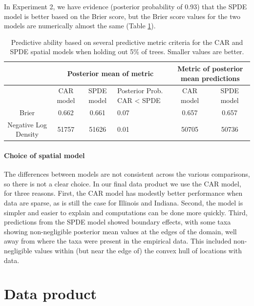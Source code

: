 \documentclass[12pt]{article}
\providecommand{\tabularnewline}{\\}
\begin{document}
In Experiment 2, we have evidence (posterior probability of 0.93)
that the SPDE model is better based on the Brier score, but the Brier
score values for the two models are numerically almost the same (Table
\ref{tab:score_tree}).



\begin{table}
\caption{Predictive ability based on several predictive metric criteria for
the CAR and SPDE spatial models when holding out 5\% of trees. Smaller
values are better.}


\begin{tabular}{|c|c|c|>{\centering}p{3cm}|c|c|}
\hline 
 &
\multicolumn{3}{c|}{{\small{}Posterior mean of metric}} &
\multicolumn{2}{c|}{{\small{}Metric of posterior mean predictions}}\tabularnewline
\hline 
\hline 
 &
{\small{}CAR model} &
{\small{}SPDE model} &
{\small{}Posterior Prob. CAR < SPDE} &
{\small{}CAR model} &
{\small{}SPDE model}\tabularnewline
\hline 
{\small{}Brier} &
{\small{}0.662} &
{\small{}0.661} &
{\small{}0.07} &
{\small{}0.657} &
{\small{}0.657}\tabularnewline
\hline 
{\small{}Negative Log Density} &
{\small{}51757} &
{\small{}51626} &
{\small{}0.01} &
{\small{}50705} &
{\small{}50736}\tabularnewline
\hline 
\end{tabular}

\label{tab:score_tree}
\end{table}



\paragraph{Choice of spatial model}

The differences between models are not consistent across the various
comparisons, so there is not a clear choice. In our final data product
we use the CAR model, for three reasons. First, the CAR model has
modestly better performance when data are sparse, as is still the
case for Illinois and Indiana. Second, the model is simpler and easier
to explain and computations can be done more quickly. Third, predictions
from the SPDE model showed boundary effects, with some taxa showing
non-negligible posterior mean values at the edges of the domain, well
away from where the taxa were present in the empirical data. This
included non-negligible values within (but near the edge of) the convex
hull of locations with data. 


\section{Data product\label{sec:Data-product}}
\end{document}

